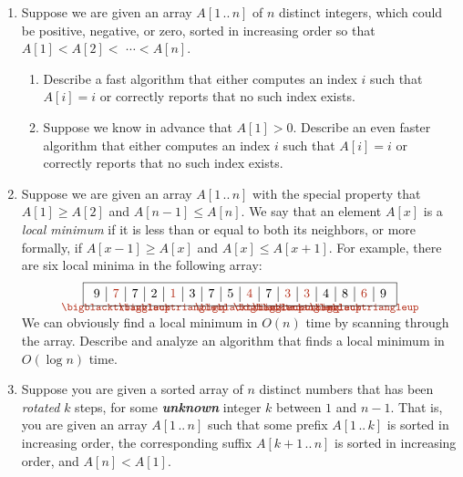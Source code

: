 \begin{exercises}
\begin{enumerate}[label=\arabic*.,ref=\thechapter.\arabic*,leftmargin=*,align=left,itemsep=1.5ex plus 0.5ex,resume]
\begin{center}
\end{center}
Describe and analyze an algorithm to find the \emph{smallest} element in an $n$-element bitonic array in $O(\log n)$ time. You may assume that the numbers in the input array are distinct.
\item Suppose we are given an array $A[1\,..\,n]$ of $n$ distinct integers, which could be positive, negative, or zero, sorted in increasing order so that $A[1] < A[2] <$ $\cdots < A[n]$.
\begin{enumerate}
\item Describe a fast algorithm that either computes an index $i$ such that $A[i] = i$ or correctly reports that no such index exists.
\item Suppose we know in advance that $A[1] > 0$. Describe an even faster algorithm that either computes an index $i$ such that $A[i] = i$ or correctly reports that no such index exists. 
\end{enumerate}
\item Suppose we are given an array $A[1\,..\,n]$ with the special property that $A[1] \ge A[2]$ and $A[n - 1] \le A[n]$. We say that an element $A[x]$ is a \emph{local minimum} if it is less than or equal to both its neighbors, or more formally, if $A[x - 1] \ge A[x]$ and $A[x] \le A[x + 1]$. For example, there are six local minima in the following array:
\[
\fbox{$\begin{array}{c|c|c|c|c|c|c|c|c|c|c|c|c|c|c|c}
9 & \textcolor{JEred}{7}\smash{\raisebox{-2.4ex}{\makebox[0pt]{\kern-0.5em{\color{JEred}\fontsize{8.6}{9}\selectfont$\bigblacktriangleup$}}}} & 7 & 2 & \textcolor{JEred}{1}\smash{\raisebox{-2.4ex}{\makebox[0pt]{\kern-0.5em{\color{JEred}\fontsize{8.6}{9}\selectfont$\bigblacktriangleup$}}}} & 3 & 7 & 5 & \textcolor{JEred}{4}\smash{\raisebox{-2.4ex}{\makebox[0pt]{\kern-0.5em{\color{JEred}\fontsize{8.6}{9}\selectfont$\bigblacktriangleup$}}}} & 7 & \textcolor{JEred}{3}\smash{\raisebox{-2.4ex}{\makebox[0pt]{\kern-0.5em{\color{JEred}\fontsize{8.6}{9}\selectfont$\bigblacktriangleup$}}}} & \textcolor{JEred}{3}\smash{\raisebox{-2.4ex}{\makebox[0pt]{\kern-0.5em{\color{JEred}\fontsize{8.6}{9}\selectfont$\bigblacktriangleup$}}}} & 4 & 8 & \textcolor{JEred}{6}\smash{\raisebox{-2.4ex}{\makebox[0pt]{\kern-0.5em{\color{JEred}\fontsize{8.6}{9}\selectfont$\bigblacktriangleup$}}}} & 9
\end{array}$}
\]
We can obviously find a local minimum in $O(n)$ time by scanning through the array. Describe and analyze an algorithm that finds a local minimum in $O(\log n)$ time. 
\item Suppose you are given a sorted array of $n$ distinct numbers that has been \emph{rotated} $k$ steps, for some \textbf{\textit{unknown}} integer $k$ between $1$ and $n - 1$. That is, you are given an array $A[1\,..\,n]$ such that some prefix $A[1\,..\,k]$ is sorted in increasing order, the corresponding suffix $A[k + 1\,..\,n]$ is sorted in increasing order, and $A[n] < A[1]$.


\end{enumerate}
\end{exercises}
